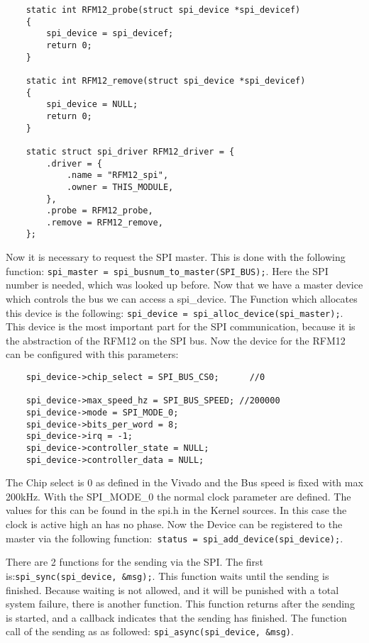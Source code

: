 \begin{lstlisting}
	static int RFM12_probe(struct spi_device *spi_devicef)
	{
		spi_device = spi_devicef;
		return 0;
	}
	
	static int RFM12_remove(struct spi_device *spi_devicef)
	{
		spi_device = NULL;
		return 0;
	}
	
	static struct spi_driver RFM12_driver = {
		.driver = {
			.name = "RFM12_spi",
			.owner = THIS_MODULE,
		},
		.probe = RFM12_probe,
		.remove = RFM12_remove,
	};
\end{lstlisting}

Now it is necessary to request the SPI master. This is done with the following function: \verb|spi_master = spi_busnum_to_master(SPI_BUS);|. Here the SPI number is needed, which was looked up before. Now that we have a master device which controls the bus we can access a spi\_device. The Function which allocates this device is the following:\newline
\verb|spi_device = spi_alloc_device(spi_master);|. This device is the most important part for the SPI communication, because it is the abstraction of the RFM12 on the SPI bus. Now the device for the RFM12 can be configured with this parameters: 

\begin{lstlisting}
	spi_device->chip_select = SPI_BUS_CS0; 		//0

	spi_device->max_speed_hz = SPI_BUS_SPEED; //200000
	spi_device->mode = SPI_MODE_0;						
	spi_device->bits_per_word = 8;
	spi_device->irq = -1;
	spi_device->controller_state = NULL;
	spi_device->controller_data = NULL;                                                                                                                         
\end{lstlisting}

The Chip select is 0 as defined in the Vivado and the Bus speed is fixed with max 200kHz. With the SPI\_MODE\_0 the normal clock parameter are defined. The values for this can be found in the spi.h in the Kernel sources. In this case the clock is active high an has no phase. Now the Device can be registered to the master via the following function:\newline \verb| status = spi_add_device(spi_device);|.\newline

There are 2 functions for the sending via the SPI. The first is:\verb|spi_sync(spi_device, &msg);|. This function waits until the sending is finished. Because waiting is not allowed, and it will be punished with a total system failure, there is another function. This function returns after the sending is started, and a callback indicates that the sending has finished. The function call of the sending as as followed: \verb|spi_async(spi_device, &msg)|.\newline

